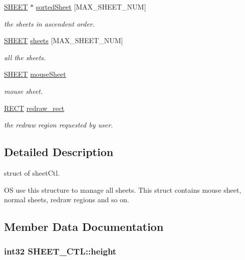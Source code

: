 \begin{DoxyCompactItemize}
\hyperlink{struct_s_h_e_e_t}{S\+H\+E\+E\+T} $\ast$ \hyperlink{struct_s_h_e_e_t___c_t_l_a2a5cb880dfb60f67ff6199210d6541e3}{sorted\+Sheet} \mbox{[}M\+A\+X\+\_\+\+S\+H\+E\+E\+T\+\_\+\+N\+U\+M\mbox{]}
\begin{DoxyCompactList}\small\item\em the sheets in ascendent order. \end{DoxyCompactList}\item 
\hyperlink{struct_s_h_e_e_t}{S\+H\+E\+E\+T} \hyperlink{struct_s_h_e_e_t___c_t_l_a2d2f4af17fdf61831f36efd2e0024698}{sheets} \mbox{[}M\+A\+X\+\_\+\+S\+H\+E\+E\+T\+\_\+\+N\+U\+M\mbox{]}
\begin{DoxyCompactList}\small\item\em all the sheets. \end{DoxyCompactList}\item 
\hyperlink{struct_s_h_e_e_t}{S\+H\+E\+E\+T} \hyperlink{struct_s_h_e_e_t___c_t_l_ac08483959e673b709053cab3add98122}{mouse\+Sheet}
\begin{DoxyCompactList}\small\item\em mouse sheet. \end{DoxyCompactList}\item 
\hyperlink{struct_r_e_c_t}{R\+E\+C\+T} \hyperlink{struct_s_h_e_e_t___c_t_l_a9bbc0e9f83ecc2809d2dda7128569161}{redraw\+\_\+rect}
\begin{DoxyCompactList}\small\item\em the redraw region requested by user. \end{DoxyCompactList}\end{DoxyCompactItemize}


\subsection{Detailed Description}
struct of sheet\+Ctl. 

O\+S use this structure to manage all sheets. This struct contains mouse sheet, normal sheets, redraw regions and so on. 

\subsection{Member Data Documentation}
\hypertarget{struct_s_h_e_e_t___c_t_l_a6587daa4ab0e04350d417a8daf705dbb}{}
\subsubsection[{height}]{\setlength{\rightskip}{0pt plus 5cm}int32 S\+H\+E\+E\+T\+\_\+\+C\+T\+L\+::height}\label{struct_s_h_e_e_t___c_t_l_a6587daa4ab0e04350d417a8daf705dbb}


